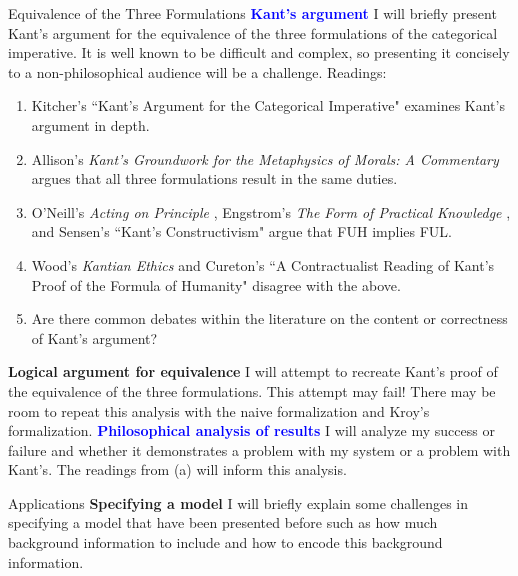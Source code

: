 \documentclass[11pt]{article}
\begin{document}
\begin{outline}[enumerate]
\1[Chapter 4:] Equivalence of the Three Formulations
\2 \textcolor{blue}{\textbf{Kant's argument}} I will briefly present Kant's argument for the equivalence of the three formulations of the categorical imperative. It is well known to be difficult and complex, so presenting it concisely to a non-philosophical audience will be a challenge. Readings:
\begin{enumerate}
    \item Kitcher's ``Kant's Argument for the Categorical Imperative" \cite{kitcher} examines Kant's argument in depth. 
    \item Allison's \emph{Kant’s Groundwork for the Metaphysics of Morals: A Commentary} \cite{allison} argues that all three formulations result in the same duties.
    \item O'Neill's \emph{Acting on Principle} \cite{o'neill_2013}, Engstrom's \emph{The Form of Practical Knowledge} \cite{engstrom}, and Sensen's ``Kant’s Constructivism" \cite{sensen} argue that FUH implies FUL.
    \item Wood's \emph{Kantian Ethics} \cite{wood_2007} and Cureton's ``A Contractualist Reading of Kant’s Proof of the Formula of Humanity" \cite{cureton_2013} disagree with the above.
    \item Are there common debates within the literature on the content or correctness of Kant's argument?
\end{enumerate}
\2 \textbf{Logical argument for equivalence} I will attempt to recreate Kant's proof of the equivalence of the three formulations. This attempt may fail! There may be room to repeat this analysis with the naive formalization and Kroy's formalization.
\2 \textcolor{blue}{\textbf{Philosophical analysis of results}} I will analyze my success or failure and whether it demonstrates a problem with my system or a problem with Kant's. The readings from (a) will inform this analysis.

\1[Chapter 5:] Applications
\2 \textbf{Specifying a model} I will briefly explain some challenges in specifying a model that have been presented before such as how much background information to include and how to encode this background information. 


\end{outline}
\end{document}
